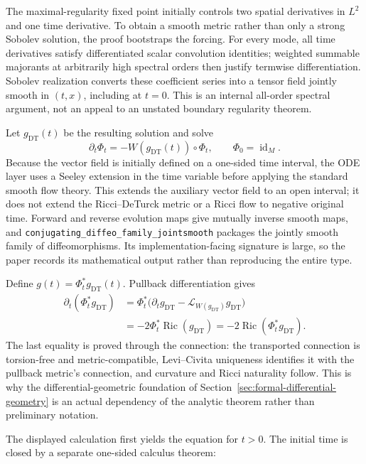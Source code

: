 \documentclass[11pt]{article}
\theoremstyle{plain}
\theoremstyle{definition}
\theoremstyle{remark}
\newcommand{\Ric}{\operatorname{Ric}}
\newcommand{\Lie}{\mathcal L}
\newcommand{\leanref}[1]{\nolinkurl{#1}}
\begin{document}
The maximal-regularity fixed point initially controls two spatial derivatives
in $L^2$ and one time derivative.  To obtain a smooth metric rather than only
a strong Sobolev solution, the proof bootstraps the forcing.  For every mode,
all time derivatives satisfy differentiated scalar convolution identities;
weighted summable majorants at arbitrarily high spectral orders then justify
termwise differentiation.  Sobolev realization converts these coefficient
series into a tensor field jointly smooth in $(t,x)$, including at $t=0$.
This is an internal all-order spectral argument, not an appeal to an unstated
boundary regularity theorem.

Let $g_{\mathrm{DT}}(t)$ be the resulting solution and solve
\[
  \partial_t\Phi_t=-W(g_{\mathrm{DT}}(t))\circ\Phi_t,
  \qquad \Phi_0=\operatorname{id}_M.
\]
Because the vector field is initially defined on a one-sided time interval,
the ODE layer uses a Seeley extension in the time variable before applying
the standard smooth flow theory.  This extends the auxiliary vector field to
an open interval; it does not extend the Ricci--DeTurck metric or a Ricci flow
to negative original time.  Forward and reverse evolution maps give mutually
inverse smooth maps, and
\leanref{conjugating_diffeo_family_jointsmooth} packages the jointly smooth
family of diffeomorphisms.  Its implementation-facing signature is large, so
the paper records its mathematical output rather than reproducing the entire
type.

Define $g(t)=\Phi_t^*g_{\mathrm{DT}}(t)$.  Pullback differentiation gives
\begin{align*}
  \partial_t(\Phi_t^*g_{\mathrm{DT}})
  &=\Phi_t^*\bigl(\partial_tg_{\mathrm{DT}}
       -\Lie_{W(g_{\mathrm{DT}})}g_{\mathrm{DT}}\bigr)\\
  &=-2\Phi_t^*\Ric(g_{\mathrm{DT}})
   =-2\Ric(\Phi_t^*g_{\mathrm{DT}}).
\end{align*}
The last equality is proved through the connection: the transported
connection is torsion-free and metric-compatible, Levi--Civita uniqueness
identifies it with the pullback metric's connection, and curvature and Ricci
naturality follow.  This is why the differential-geometric foundation of
Section~\ref{sec:formal-differential-geometry} is an actual dependency of the
analytic theorem rather than preliminary notation.

The displayed calculation first yields the equation for $t>0$.  The initial
time is closed by a separate one-sided calculus theorem:
\end{document}
